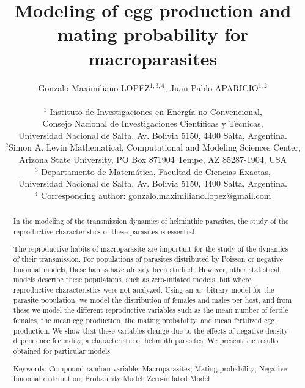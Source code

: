 \documentclass[12pt,a4paper]{article}
\title{Modeling of egg production and mating probability for macroparasites}
\author{Gonzalo Maximiliano LOPEZ$^{1,3,4}$, Juan Pablo APARICIO$^{1,2}$\\
	\\
	{\small $^1$ Instituto de Investigaciones en Energ\'ia no Convencional,} \\ {\small Consejo Nacional de Investigaciones Cient\'ificas y T\'ecnicas,}\\
	{\small Universidad Nacional de Salta, Av. Bolivia 5150, 4400 Salta, Argentina.}\\
	$^2${\small Simon A. Levin Mathematical, Computational and Modeling Sciences Center,} \\ {\small Arizona State University, PO Box 871904 Tempe, AZ 85287-1904, USA}\\
	{\small $^3$ Departamento de Matem\'atica, Facultad de Ciencias Exactas,}\\{\small Universidad Nacional de Salta, Av. Bolivia 5150, 4400 Salta, Argentina.}\\
	{\small $^4$ Corresponding author: gonzalo.maximiliano.lopez@gmail.com}}
\date{}
\theoremstyle{plain}%
\theoremstyle{definition}
\theoremstyle{remark}
\begin{document}
\maketitle

\begin{abstract}

In the modeling of the transmission dynamics of helminthic parasites, the study of the reproductive characteristics of these parasites is essential.

The reproductive habits of macroparasite are important for the study of the dynamics of their transmission. For populations of parasites distributed by Poisson or negative binomial models, these habits have already been studied. However, other statistical models describe these populations, such as zero-inflated models, but where reproductive characteristics were not analyzed. Using an ar- bitrary model for the parasite population, we model the distribution of females and males per host, and from these we model the different reproductive variables such as the mean number of fertile females, the mean egg production, the mating probability, and mean fertilized egg production. We show that these variables change due to the effects of negative density-dependence fecundity, a characteristic of helminth parasites. We present the results obtained for particular models.

	
	Keywords: Compound random variable; Macroparasites; Mating probability; Negative binomial distribution; Probability Model; Zero-inflated Model
\end{abstract}
\end{document}

